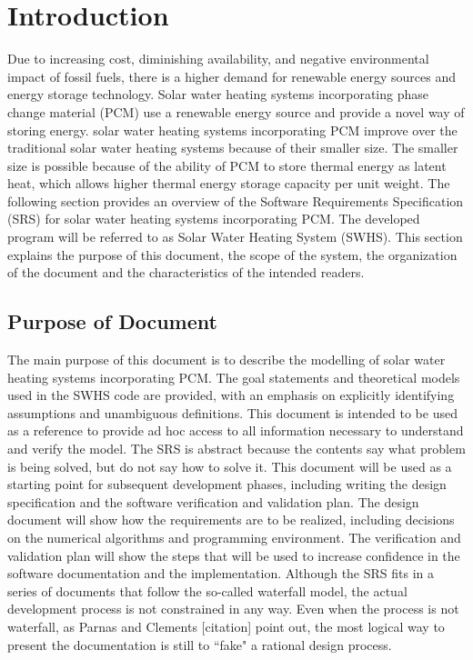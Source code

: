 \documentclass[12pt]{article}
\begin{document}
\section{Introduction}
\label{Sec:I}
Due to increasing cost, diminishing availability, and negative environmental impact of fossil fuels, there is a higher demand for renewable energy sources and energy storage technology. Solar water heating systems incorporating phase change material (PCM) use a renewable energy source and provide a novel way of storing energy. solar water heating systems incorporating PCM improve over the traditional solar water heating systems because of their smaller size. The smaller size is possible because of the ability of PCM to store thermal energy as latent heat, which allows higher thermal energy storage capacity per unit weight.
 The following section provides an overview of the Software Requirements Specification (SRS) for solar water heating systems incorporating PCM. The developed program will be referred to as Solar Water Heating System (SWHS). This section explains the purpose of this document, the scope of the system, the organization of the document and the characteristics of the intended readers.
\subsection{Purpose of Document}
\label{Sec:PoD}
The main purpose of this document is to describe the modelling of solar water heating systems incorporating PCM. The goal statements and theoretical models used in the SWHS code are provided, with an emphasis on explicitly identifying assumptions and unambiguous definitions. This document is intended to be used as a reference to provide ad hoc access to all information necessary to understand and verify the model. The SRS is abstract because the contents say what problem is being solved, but do not say how to solve it.
This document will be used as a starting point for subsequent development phases, including writing the design specification and the software verification and validation plan. The design document will show how the requirements are to be realized, including decisions on the numerical algorithms and programming environment. The verification and validation plan will show the steps that will be used to increase confidence in the software documentation and the implementation. Although the SRS fits in a series of documents that follow the so-called waterfall model, the actual development process is not constrained in any way. Even when the process is not waterfall, as Parnas and Clements [citation] point out, the most logical way to present the documentation is still to ``fake" a rational design process.
\end{document}
